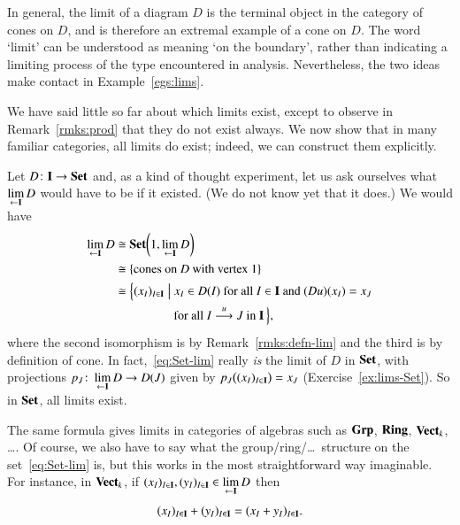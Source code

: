 In general, the limit of a diagram $D$ is the terminal object in the
category of cones on $D$, and is therefore an extremal example of a cone on
$D$.  The word `limit' can be understood as meaning `on the boundary',
rather than indicating a limiting process of the type encountered in
analysis.  Nevertheless, the two ideas make contact in
Example~\ref{egs:lims}.

We have said little so far about which limits exist, except to observe in
Remark~\ref{rmks:prod} that they do not exist
always.  We now show that in many familiar categories, all limits do exist;
indeed, we can construct them explicitly.

\begin{example}
\label{eg:lims-Set}
Let $D\from \scat{I} \to \Set$ and, as a kind of thought%
%
%
experiment, let us ask ourselves what $\lim\limits_{\leftarrow \mathbf{I}} D$%
%
%
would have to be if it existed.  (We do not know yet that it does.)  We
would have
%
\begin{align}
\lt{\scat{I}} D        &
\iso   \Set\biggl(1, \lt{\scat{I}} D\biggr)
\nonumber       \\
                        &
\iso
\{ \text{cones on } D \text{ with vertex } 1 \}
\nonumber       \\
                        &\iso
\Bigl\{
(x_I)_{I \in \scat{I}}
\Bigsuch
x_I \in D(I) \text{ for all } I \in \scat{I} \text{ and }
(Du)(x_I) = x_J
\nonumber \\
        &
\phantom{\iso \Bigl\{ (x_I)_{I \in \scat{I}} \Bigsuch {}}
\text{ for all } I \toby{u} J \text{ in }
\scat{I}
\,\Bigr\},
\label{eq:Set-lim}
\end{align}
%
where the second isomorphism is by
Remark~\ref{rmks:defn-lim} and the third is by
definition of cone.  In fact,~\eqref{eq:Set-lim} really \emph{is} the limit
of $D$ in $\mathbf{Set}$, with projections $p_J\from \lt{\scat{I}} D \to D(J)$
given by $p_J\bigl( (x_I)_{I \in \mathbf{I}} \bigr) = x_J$
(Exercise~\ref{ex:lims-Set}).  So in $\mathbf{Set}$, all limits exist.
\end{example}

\begin{example}
\label{eg:lims-alg}
The same formula gives limits in categories of algebras such as $\mathbf{Grp}$,%
%
%
$\mathbf{Ring}$,%
%
%
$\mathbf{Vect}_k$,%
%
%
\ldots.  Of course, we also have to say what the
group/ring/\ldots\ structure on the set~\eqref{eq:Set-lim} is, but this
works in the most straightforward way imaginable.  For instance, in
$\mathbf{Vect}_k$, if $(x_I)_{I \in \mathbf{I}}, (y_I)_{I \in \mathbf{I}} \in
\lim\limits_{\leftarrow \mathbf{I}} D$ then
\[
(x_I)_{I \in \mathbf{I}} + (y_I)_{I \in \mathbf{I}}
=
(x_I + y_I)_{I \in \mathbf{I}}.
\]
\end{example}

